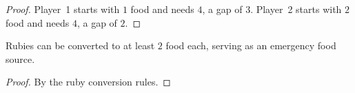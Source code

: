 \begin{proof}
  \leanok
  Player~1 starts with $1$ food and needs $4$, a gap of $3$.
  Player~2 starts with $2$ food and needs $4$, a gap of $2$.
\end{proof}

\begin{theorem}
  \label{thm:ruby_emergency}
  \leanok
  Rubies can be converted to at least $2$ food each, serving as
  an emergency food source.
\end{theorem}

\begin{proof}\leanok By the ruby conversion rules.\end{proof}
